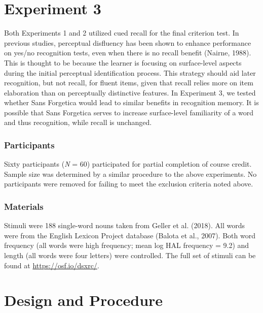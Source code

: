 \documentclass[jou]{apa6}
\begin{document}
\hypertarget{experiment-3}{%
\section{Experiment 3}\label{experiment-3}}

Both Experiments 1 and 2 utilized cued recall for the final criterion test. In previous studies, perceptual disfluency has been shown to enhance performance on yes/no recognition tests, even when there is no recall benefit (Nairne, 1988). This is thought to be because the learner is focusing on surface-level aspects during the initial perceptual identification process. This strategy should aid later recognition, but not recall, for fluent items, given that recall relies more on item elaboration than on perceptually distinctive features. In Experiment 3, we tested whether Sans Forgetica would lead to similar benefits in recognition memory. It is possible that Sans Forgetica serves to increase surface-level familiarity of a word and thus recognition, while recall is unchanged.

\hypertarget{participants-2}{%
\subsubsection{Participants}\label{participants-2}}

Sixty participants (\emph{N} = 60) participated for partial completion of course credit. Sample size was determined by a similar procedure to the above experiments. No participants were removed for failing to meet the exclusion criteria noted above.

\hypertarget{materials-1}{%
\subsubsection{Materials}\label{materials-1}}

Stimuli were 188 single-word nouns taken from Geller et al. (2018). All words were from the English Lexicon Project database (Balota et al., 2007). Both word frequency (all words were high frequency; mean log HAL frequency = 9.2) and length (all words were four letters) were controlled. The full set of stimuli can be found at \url{https://osf.io/dsxrc/}.

\hypertarget{design-and-procedure-1}{%
\section{Design and Procedure}\label{design-and-procedure-1}}
\end{document}
